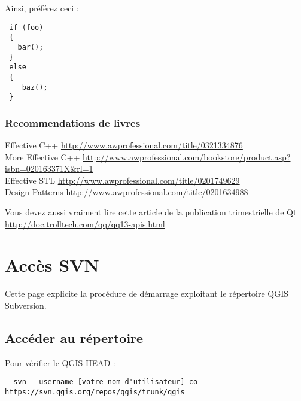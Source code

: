 Ainsi, pr\'ef\'erez ceci :

\begin{verbatim}
 if (foo)
 {
   bar();
 }
 else
 { 
    baz();
 } 
\end{verbatim}

\subsubsection{Recommendations de livres}

Effective C++ \url{http://www.awprofessional.com/title/0321334876} \\
More Effective C++ \url{http://www.awprofessional.com/bookstore/product.asp?isbn=020163371X&rl=1} \\
Effective STL \url{http://www.awprofessional.com/title/0201749629} \\
Design Patterns \url{http://www.awprofessional.com/title/0201634988}

Vous devez aussi vraiment lire cette article de la publication trimestrielle de Qt \url{http://doc.trolltech.com/qq/qq13-apis.html}
\section{Acc\`es SVN}
Cette page explicite la proc\'edure de d\'emarrage exploitant le r\'epertoire QGIS Subversion.
\subsection{Acc\'eder au r\'epertoire}
Pour v\'erifier le QGIS HEAD :
\begin{verbatim}
  svn --username [votre nom d'utilisateur] co https://svn.qgis.org/repos/qgis/trunk/qgis
\end{verbatim}

